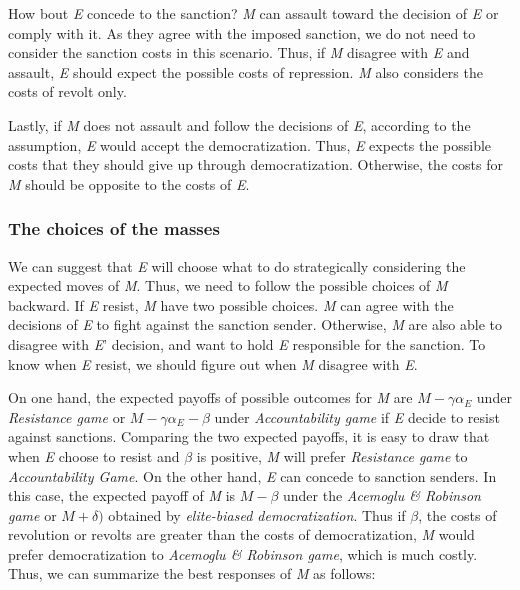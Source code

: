 \documentclass[11pt, letterpage, titlepage]{article}
\begin{document}
How bout \textit{E} concede to the sanction? \textit{M} can assault toward the decision of \textit{E} or comply with it. As they agree with the imposed sanction, we do not need to consider the sanction costs in this scenario. Thus, if \textit{M} disagree with \textit{E} and assault, \textit{E} should expect the possible costs of repression. \textit{M} also considers the costs of revolt only.
	
Lastly, if \textit{M} does not assault and follow the decisions of \textit{E}, according to the assumption, \textit{E} would accept the democratization. Thus, \textit{E} expects the possible costs that they should give up through democratization. Otherwise, the costs for \textit{M} should be opposite to the costs of \textit{E}.
	
\subsubsection*{The choices of the masses}

We can suggest that \textit{E} will choose what to do strategically considering the expected moves of \textit{M}. Thus, we need to follow the possible choices of \textit{M} backward. If \textit{E} resist, \textit{M} have two possible choices. \textit{M} can agree with the decisions of \textit{E} to fight against the sanction sender. Otherwise,  \textit{M} are also able to disagree with \textit{E}' decision, and want to hold \textit{E} responsible for the sanction. To know when \textit{E} resist, we should figure out when \textit{M} disagree with \textit{E}.
	
On one hand, the expected payoffs of possible outcomes for \textit{M} are $M-\gamma\alpha_{E}$ under \textit{Resistance game} or $M-\gamma\alpha_{E}-\beta$ under \textit{Accountability game} if \textit{E} decide to resist against sanctions. Comparing the two expected payoffs, it is easy to draw that when \textit{E} choose to resist and $\beta$ is positive, \textit{M} will prefer \textit{Resistance game} to \textit{Accountability Game}. On the other hand, \textit{E} can concede to sanction senders. In this case, the expected payoff of \textit{M} is $M-\beta$ under the \textit{Acemoglu \& Robinson game} or $M+\delta)$ obtained by \textit{elite-biased democratization}. Thus if $\beta$, the costs of revolution or revolts are greater than the costs of democratization, \textit{M} would prefer democratization to \textit{Acemoglu \& Robinson game}, which is much costly. Thus, we can summarize the best responses of \textit{M} as follows:
\end{document}
